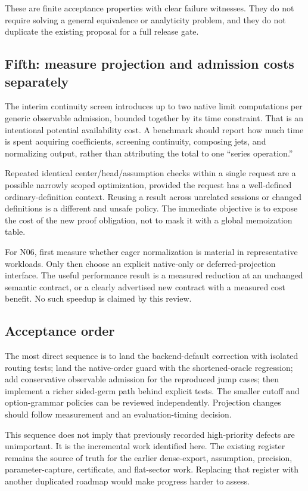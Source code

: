 \documentclass[11pt,letterpaper]{article}
\begin{document}
These are finite acceptance properties with clear failure witnesses. They do
not require solving a general equivalence or analyticity problem, and they do
not duplicate the existing proposal for a full release gate.

\subsection{Fifth: measure projection and admission costs separately}
The interim continuity screen introduces up to two native limit computations
per generic observable admission, bounded together by its time constraint.
That is an intentional potential availability cost. A benchmark should report
how much time is spent acquiring coefficients, screening continuity, composing
jets, and normalizing output, rather than attributing the total to one
``series operation.''

Repeated identical center/head/assumption checks within a single request are a
possible narrowly scoped optimization, provided the request has a well-defined
ordinary-definition context. Reusing a result across unrelated sessions or
changed definitions is a different and unsafe policy. The immediate objective
is to expose the cost of the new proof obligation, not to mask it with a global
memoization table.

For N06, first measure whether eager normalization is material in representative
workloads. Only then choose an explicit native-only or deferred-projection
interface. The useful performance result is a measured reduction at an unchanged
semantic contract, or a clearly advertised new contract with a measured cost
benefit. No such speedup is claimed by this review.

\subsection{Acceptance order}
The most direct sequence is to land the backend-default correction with isolated
routing tests; land the native-order guard with the shortened-oracle regression;
add conservative observable admission for the reproduced jump cases; then
implement a richer sided-germ path behind explicit tests. The smaller cutoff
and option-grammar policies can be reviewed independently. Projection changes
should follow measurement and an evaluation-timing decision.

This sequence does not imply that previously recorded high-priority defects are
unimportant. It is the incremental work identified here. The existing register
remains the source of truth for the earlier dense-export, assumption, precision,
parameter-capture, certificate, and flat-sector work. Replacing that register
with another duplicated roadmap would make progress harder to assess.
\end{document}
